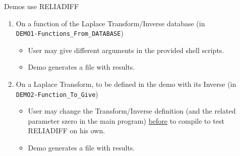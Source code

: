 \documentclass[10pt]{article}
\begin{document}
Demos use RELIADIFF
\begin{enumerate}
	\item On a function of the Laplace Transform/Inverse database (in\\{\tt DEMO1-Functions\_From\_DATABASE})
		      \begin{itemize}
		      \item User may give different arguments in the provided shell scripts.
		      \item Demo generates a file with results.
		      \end{itemize}
	\item On a Laplace Transform, to be defined in the demo with its Inverse (in {\tt DEMO2-Function\_To\_Give})
		      \begin{itemize}
		      \item User may change the Transform/Inverse definition (and the related parameter szero in the main program) \underline{before} to compile to test RELIADIFF on his own.
		      \item Demo generates a file with results.
		      \end{itemize}
\end{enumerate}
\end{document}
